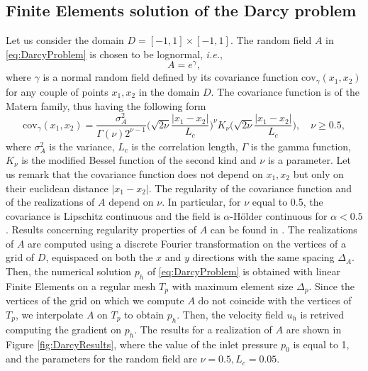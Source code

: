 

\subsection{Finite Elements solution of the Darcy problem}

Let us consider the domain $D = [-1,1] \times [-1,1]$. The random field $A$ in \eqref{eq:DarcyProblem} is chosen to be lognormal, \textit{i.e.}, 
\begin{equation}\label{eq:RandomField}
	A = e^\gamma,
\end{equation}
where $\gamma$ is a normal random field defined by its covariance function $\mathrm{cov}_\gamma(x_1,x_2)$ for any couple of points $x_1,x_2$ in the domain $D$. The covariance function is of the Matern family, thus having the following form
\begin{equation}\label{eq:CovFunction}
	\mathrm{cov}_\gamma(x_1,x_2) = \frac{\sigma_A^2}{\Gamma(\nu)2^{\nu-1}}\Big(\sqrt{2\nu}\frac{|x_1-x_2|}{L_c}\Big)^\nu K_{\nu}\Big(\sqrt{2\nu}\frac{|x_1-x_2|}{L_c}\Big), \quad \nu \geq 0.5,
\end{equation}
where $\sigma_A^2$ is the variance, $L_c$ is the correlation length, $\Gamma$ is the gamma function, $K_\nu$ is the modified Bessel function of the second kind and $\nu$ is a parameter. Let us remark that the covariance function does not depend on $x_1, x_2$ but only on their euclidean distance $|x_1 - x_2|$. The regularity of the covariance function and of the realizations of $A$ depend on $\nu$. In particular, for $\nu$ equal to 0.5, the covariance is Lipschitz continuous and the field is $\alpha$-Hölder continuous for $\alpha < 0.5$. Results concerning regularity properties of $A$ can be found in \cite{Nobile2015}. The realizations of $A$ are computed using a discrete Fourier transformation on the vertices of a grid of $D$, equispaced on both the $x$ and $y$ directions with the same spacing $\Delta_A$. Then, the numerical solution $p_h$ of \eqref{eq:DarcyProblem} is obtained with linear Finite Elements on a regular mesh $T_p$ with maximum element size $\Delta_p$. Since the vertices of the grid on which we compute $A$ do not coincide with the vertices of $T_p$, we interpolate $A$ on $T_p$ to obtain $p_h$. Then, the velocity field $u_h$ is retrived computing the gradient on $p_h$. The results for a realization of $A$ are shown in Figure \ref{fig:DarcyResults}, where the value of the inlet pressure $p_0$ is equal to 1, and the parameters for the random field are $\nu = 0.5, L_c = 0.05$. 

